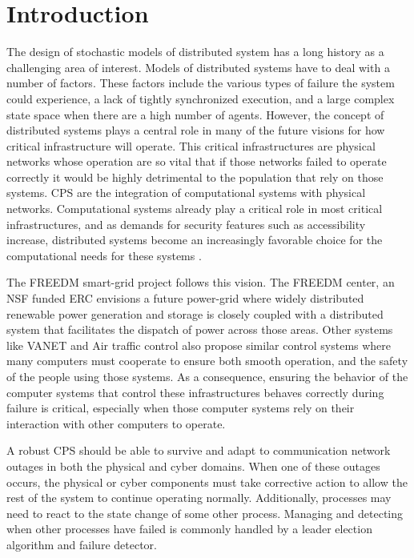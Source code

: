 \chapter{Introduction}

The design of stochastic models of distributed system has a long history as a challenging area of interest.
Models of distributed systems have to deal with a number of factors.
These factors include the various types of failure the system could experience, a lack of tightly synchronized execution, and a large complex state space when there are a high number of agents\cite{DISTRIBUTED}\cite{distributed-challenges}. 
However, the concept of distributed systems plays a central role in many of the future visions for how critical infrastructure will operate.
This critical infrastructures are physical networks whose operation are so vital that if those networks failed to operate correctly it would be highly detrimental to the population that rely on those systems.
\ac{CPS} are the integration of computational systems with physical networks.
Computational systems already play a critical role in most critical infrastructures, and as demands for security features such as accessibility increase, distributed systems become an increasingly favorable choice for the computational needs for these systems \cite{SMARTGRIDBENEFITS}.

The \ac{FREEDM}\cite{FREEDM} smart-grid project follows this vision.
The \ac{FREEDM} center, an NSF funded ERC envisions a future power-grid where widely distributed renewable power generation and storage is closely coupled with a distributed system that facilitates the dispatch of power across those areas.
Other systems like \ac{VANET}\cite{CARS1}\cite{CARS2}\cite{vanet-congestion} and Air traffic control \cite{AIRTRAFFIC1}\cite{AIRTRAFFIC2} also propose similar control systems where many computers must cooperate to ensure both smooth operation, and the safety of the people using those systems.
As a consequence, ensuring the behavior of the computer systems that control these infrastructures behaves correctly during failure is critical, especially when those computer systems rely on their interaction with other computers to operate.

A robust \ac{CPS} should be able to survive and adapt to communication network outages in both the physical and cyber domains.
When one of these outages occurs, the physical or cyber components must take corrective action to allow the rest of the system to continue operating normally.
Additionally, processes may need to react to the state change of some other process.
Managing and detecting when other processes have failed is commonly handled by a leader election algorithm and failure detector.


